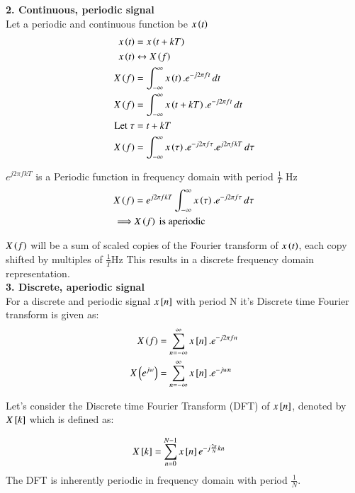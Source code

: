 \documentclass[journal,12pt,onecolumn]{IEEEtran}
\theoremstyle{remark}
\begin{document}
\textbf{2. Continuous, periodic signal}\\

Let a periodic and continuous function be $x\left(t\right)$
\begin{align}
x\left(t\right)&=x\left(t+kT\right)\\
x\left(t\right)& \leftrightarrow X\left(f\right)\\
X\left(f\right)&=\int_{-\infty}^{\infty} x\left(t\right).e^{-j2\pi ft}\,dt\\
X\left(f\right)&=\int_{-\infty}^{\infty} x\left(t+kT\right).e^{-j2\pi ft}\,dt\\
\text{Let } \tau &= t+kT\\
X\left(f\right)&=\int_{-\infty}^{\infty} x\left(\tau\right).e^{-j2\pi f\tau}.e^{j2\pi fkT}\,d\tau
\end{align}

$e^{j2\pi fkT} $ is a Periodic function in frequency domain with period $\frac{1}{T}$ Hz \\
\begin{align}
X\left(f\right)&=e^{j2\pi fkT}\int_{-\infty}^{\infty} x\left(\tau\right).e^{-j2\pi f\tau}\,d\tau\\
\implies &X\left(f\right) \text{ is aperiodic}
\end{align}


$X\left(f\right)$ will be  a sum of scaled copies of the Fourier transform of $x\left(t\right)$, each copy shifted by multiples of $\frac{1}{T}$Hz This results in a discrete frequency domain representation.\\
\vspace{2mm}
\textbf{3. Discrete, aperiodic signal}\\


For a discrete and periodic signal  $x{}\left[n\right]$ with period N it's Discrete time Fourier transform is given as: 
\begin{align}
X\left(f\right)&= \sum_{n=-\infty}^{\infty} x{}\left[n\right].e^{-j2\pi fn}\\
X\left(e^{jw}\right)&= \sum_{n=-\infty}^{\infty} x{}\left[n\right].e^{-jwn}
\end{align}

Let's consider the Discrete time Fourier Transform (DFT) of $x{}\left[n\right]$, denoted by $ X{}\left[k\right]$ which is defined as:

\begin{align}
X{}\left[k\right]&=\sum_{n=0}^{N-1}x{}\left[n\right]e^{-j\frac{2\pi}{N}kn}
\end{align}
The DFT is inherently periodic in frequency domain with period $\frac{1}{N}$.\\
\end{document}
